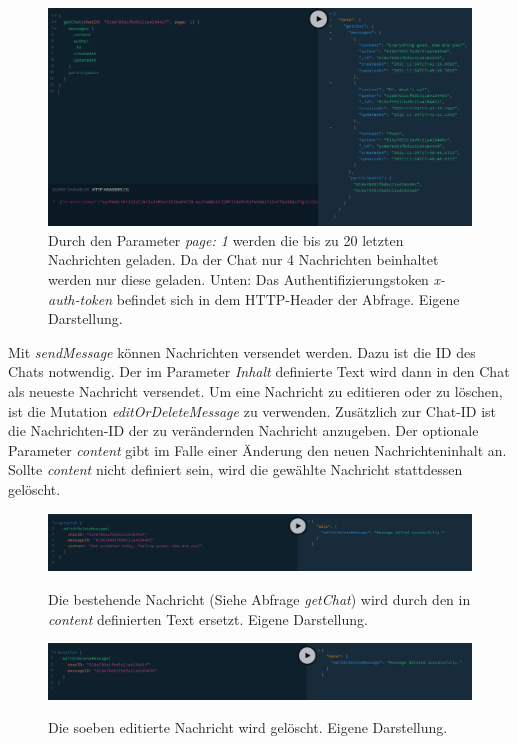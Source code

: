 \begin{figure}
	\centering
    \includegraphics[width=\textwidth]{sources/graphiql_getChat.png}
	\caption{Durch den Parameter \textit{page: 1} werden die bis zu 20 letzten Nachrichten geladen. Da der Chat nur 4 Nachrichten beinhaltet werden nur diese geladen. Unten: Das Authentifizierungstoken \textit{x-auth-token} befindet sich in dem HTTP-Header der Abfrage. Eigene Darstellung.}
	\label{fig:gql:7}
\end{figure}

Mit \textit{sendMessage} können Nachrichten versendet werden. Dazu ist die ID des Chats notwendig.
Der im Parameter \textit{Inhalt} definierte Text wird dann in den Chat als neueste Nachricht versendet.
Um eine Nachricht zu editieren  oder zu löschen, ist die Mutation \textit{editOrDeleteMessage} zu verwenden.
Zusätzlich zur Chat-ID ist die Nachrichten-ID der zu verändernden Nachricht anzugeben. Der optionale Parameter \textit{content} gibt im Falle einer Änderung den neuen Nachrichteninhalt an.
Sollte \textit{content} nicht definiert sein, wird die gewählte Nachricht stattdessen gelöscht. 

\begin{figure}
	\centering
    \includegraphics[width=\textwidth]{sources/graphiql_editMessage.png}\cite{}
	\caption{Die bestehende Nachricht (Siehe Abfrage \textit{getChat}) wird durch den in \textit{content} definierten Text ersetzt. Eigene Darstellung.}
	\label{fig:gql:8}
\end{figure}

\begin{figure}
	\centering
    \includegraphics[width=\textwidth]{sources/graphiql_deleteMessage.png}\cite{}
	\caption{Die soeben editierte Nachricht wird gelöscht. Eigene Darstellung.}
	\label{fig:gql:9}
\end{figure}

